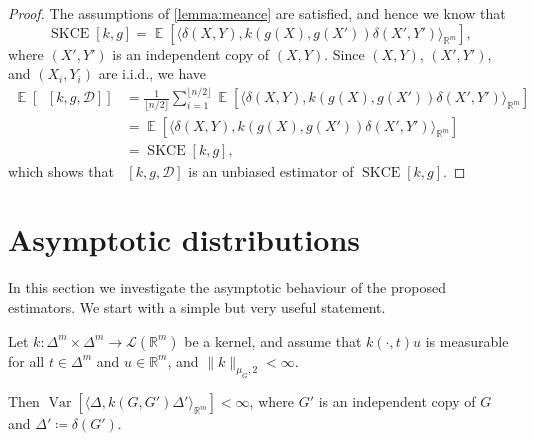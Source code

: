 \documentclass{article}
\DeclareMathOperator{\Expect}{\mathbb{E}}
\DeclareMathOperator{\Var}{Var}
\DeclareMathOperator{\squaredkernelmeasure}{SKCE}
\DeclareMathOperator{\linearestimator}{\widehat{SKCE}_{ul}}
\begin{document}
\begin{proof}
  The assumptions of \cref{lemma:meance} are satisfied, and hence we know that
  \begin{equation*}
    \squaredkernelmeasure[k, g] = \Expect[\langle \delta(X, Y), k(g(X), g(X')) \delta(X', Y')\rangle_{\mathbb{R}^m}],
  \end{equation*}
  where $(X', Y')$ is an independent copy of $(X,Y)$. Since $(X,Y)$, $(X',Y')$,
  and $(X_i, Y_i)$ are i.i.d., we have
  \begin{equation*}
    \begin{split}
      \Expect[\linearestimator[k, g, \mathcal{D}]] &= \frac{1}{\lfloor n / 2\rfloor} \sum_{i=1}^{\lfloor n / 2 \rfloor} \Expect[\langle \delta(X,Y), k(g(X), g(X')) \delta(X',Y')\rangle_{\mathbb{R}^m}] \\
      &= \Expect[\langle \delta(X,Y), k(g(X),g(X')) \delta(X',Y')\rangle_{\mathbb{R}^m}] \\
      &= \squaredkernelmeasure[k, g],
    \end{split}
  \end{equation*}
  which shows that $\linearestimator[k, g, \mathcal{D}]$ is an unbiased
  estimator of $\squaredkernelmeasure[k, g]$.
\end{proof}

\section{Asymptotic distributions}

In this section we investigate the asymptotic behaviour of the proposed
estimators. We start with a simple but very useful statement.

\begin{lemma}\label{lemma:square_integrable}
  Let $k \colon \Delta^m \times \Delta^m \to \mathcal{L}(\mathbb{R}^m)$ be a
  kernel, and assume that $k(\cdot,t) u$ is measurable for all
  $t \in \Delta^m$ and $u \in \mathbb{R}^m$, and $\|k\|_{\mu_G,2} < \infty$.

  Then $\Var[\langle \Delta, k(G,G') \Delta'\rangle_{\mathbb{R}^m}] < \infty$,
  where $G'$ is an independent copy of $G$ and $\Delta' \coloneqq \delta(G')$.
\end{lemma}
\end{document}
